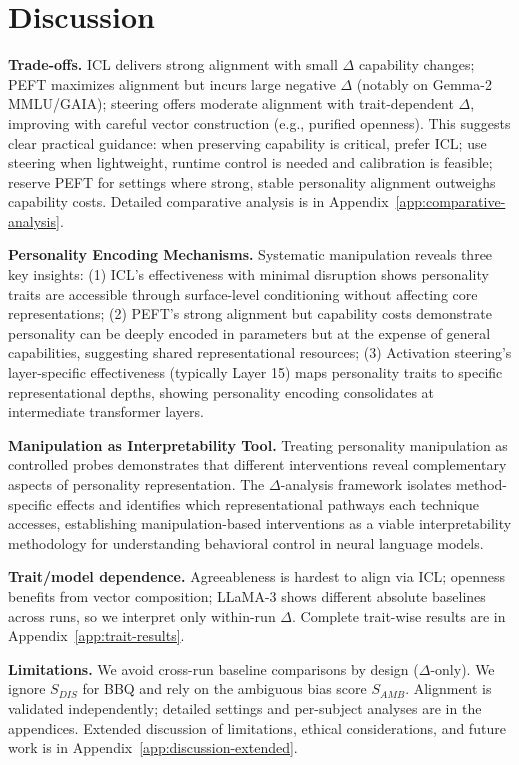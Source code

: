 \section{Discussion}

\textbf{Trade-offs.} ICL delivers strong alignment with small \(\Delta\) capability changes; PEFT maximizes alignment but incurs large negative \(\Delta\) (notably on Gemma-2 MMLU/GAIA); steering offers moderate alignment with trait-dependent \(\Delta\), improving with careful vector construction (e.g., purified openness). This suggests clear practical guidance: when preserving capability is critical, prefer ICL; use steering when lightweight, runtime control is needed and calibration is feasible; reserve PEFT for settings where strong, stable personality alignment outweighs capability costs. Detailed comparative analysis is in Appendix~\ref{app:comparative-analysis}.

\textbf{Personality Encoding Mechanisms.} Systematic manipulation reveals three key insights: (1) ICL's effectiveness with minimal disruption shows personality traits are accessible through surface-level conditioning without affecting core representations; (2) PEFT's strong alignment but capability costs demonstrate personality can be deeply encoded in parameters but at the expense of general capabilities, suggesting shared representational resources; (3) Activation steering's layer-specific effectiveness (typically Layer 15) maps personality traits to specific representational depths, showing personality encoding consolidates at intermediate transformer layers.

\textbf{Manipulation as Interpretability Tool.} Treating personality manipulation as controlled probes demonstrates that different interventions reveal complementary aspects of personality representation. The \(\Delta\)-analysis framework isolates method-specific effects and identifies which representational pathways each technique accesses, establishing manipulation-based interventions as a viable interpretability methodology for understanding behavioral control in neural language models.

\textbf{Trait/model dependence.} Agreeableness is hardest to align via ICL; openness benefits from vector composition; LLaMA-3 shows different absolute baselines across runs, so we interpret only within-run \(\Delta\). Complete trait-wise results are in Appendix~\ref{app:trait-results}.

\textbf{Limitations.} We avoid cross-run baseline comparisons by design (\(\Delta\)-only). We ignore \(S_{DIS}\) for BBQ and rely on the ambiguous bias score \(S_{AMB}\). Alignment is validated independently; detailed settings and per-subject analyses are in the appendices. Extended discussion of limitations, ethical considerations, and future work is in Appendix~\ref{app:discussion-extended}.